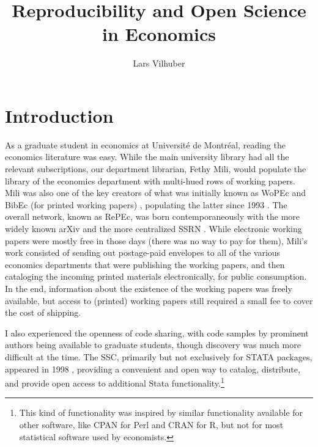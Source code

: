 \documentclass{article}
\author[1]{Lars Vilhuber}
\affil[1]{Cornell University}
\title{Reproducibility and Open Science in Economics}
\begin{document}
\maketitle

\newpage
\section{Introduction}


As a graduate student in economics at Université de Montréal, reading the economics literature was  easy. While the main university library had all the relevant subscriptions, our department librarian, Fethy Mili, would populate the library of the economics department with multi-hued rows of working papers. Mili was also one of the key creators of what was initially known as \ac{WoPEc} and BibEc (for printed working papers) \citep{krichel_wopec_1997,cruz_cataloging_2000,krichel_economics_2009}, populating the latter since 1993 \citep[][p. 450]{batizlazo_brief_2012}. The overall network, known as \ac{RePEc}, was born contemporaneously with the more widely known arXiv \citep{ginsparg_it_2011} and the more centralized \ac{SSRN} \citep{noauthor_social_2025}. While electronic working papers were mostly free in those days (there was no way to pay for them), Mili's work consisted of sending out postage-paid envelopes to all of the various economics departments that were publishing the working papers, and then cataloging the incoming printed materials electronically, for public consumption. In the end, information about the existence of the working papers was freely available, but access to (printed) working papers still required a small fee to cover the cost of shipping.

I also experienced the openness of code sharing, with code samples by prominent authors being available to graduate students, though discovery was much more difficult at the time.  The \ac{SSC}, primarily but not exclusively for STATA packages, appeared in 1998 \citep{cox_conversation_2010,cox_stata_2022}, providing a convenient and open way to catalog, distribute, and provide open access to additional Stata functionality.\footnote{This kind of functionality was inspired by similar functionality  available for other software, like CPAN for Perl and CRAN for R, but not for most statistical software used by economists.}
\end{document}
